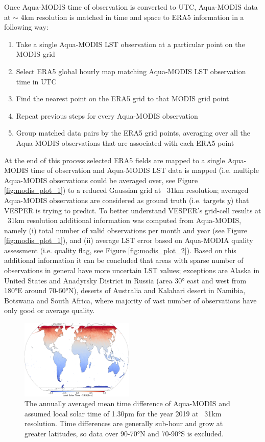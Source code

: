 \documentclass[hess, twostagejnl]{copernicus}
\begin{document}
\noindent Once Aqua-MODIS time of observation is converted to UTC, Aqua-MODIS data at $\sim$ 4km resolution is matched in time and space to ERA5 information in a following way:
\begin{enumerate}
	\item Take a single Aqua-MODIS LST observation at a particular point on the MODIS grid
	\item Select ERA5 global hourly map matching Aqua-MODIS LST observation time in UTC
	\item Find the nearest point on the ERA5 grid to that MODIS grid point
	\item Repeat previous steps for every Aqua-MODIS observation
	\item Group matched data pairs by the ERA5 grid points, averaging over all the Aqua-MODIS observations that are associated with each ERA5 point
\end{enumerate}
At the end of this process selected ERA5 fields are mapped to a single Aqua-MODIS time of observation and Aqua-MODIS LST data is mapped (i.e. multiple Aqua-MODIS observations could be averaged over, see Figure \ref{fig:modis_plot_1}) to a reduced Gaussian grid at ~31km resolution; averaged Aqua-MODIS observations are considered as ground truth (i.e. targets $y$) that VESPER is trying to predict. To better understand VESPER’s grid-cell results at ~31km resolution additional information was computed from Aqua-MODIS, namely (i) total number of valid observations per month and year (see Figure \ref{fig:modis_plot_1}), and (ii) average LST error based on Aqua-MODIA quality assessment (i.e. quality flag, see Figure \ref{fig:modis_plot_2}). Based on this additional information it can be concluded that areas with sparse number of observations in general have more uncertain LST values; exceptions are Alaska in United States and Anadyrsky District in Russia (area 30° east and west from 180°E around 70-60°N), deserts of Australia and Kalahari desert in Namibia, Botswana and South Africa, where majority of vast number of observations have only good or average quality.

\begin{figure}
	\includegraphics[width=0.48\textwidth]{MODIS_local_solar_time_diff}
	\caption{The annually averaged mean time difference of Aqua-MODIS and assumed local solar time of 1.30pm for the year 2019 at ~31km resolution. Time differences are generally sub-hour and grow at greater latitudes, so data over 90-70°N and 70-90°S is excluded. } 
	\label{fig:MODIS_time_error}
\end{figure}
\end{document}
